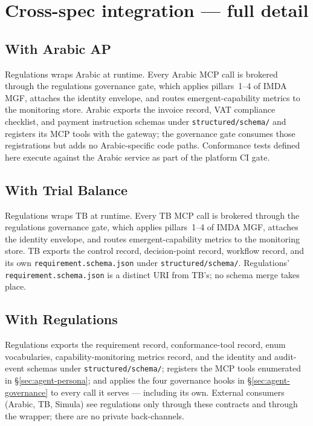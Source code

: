 \documentclass[11pt,a4paper,twoside]{report}
\begin{document}
\section{Cross-spec integration --- full detail}
\label{sec:agent-integration}

\subsection{With Arabic AP}
Regulations wraps Arabic at runtime. Every Arabic MCP call is
brokered through the regulations governance gate, which applies
pillars~1--4 of IMDA MGF, attaches the identity envelope, and routes
emergent-capability metrics to the monitoring store. Arabic exports
the invoice record, VAT compliance checklist, and payment
instruction schemas under \texttt{structured/schema/} and registers
its MCP tools with the gateway; the governance gate consumes those
registrations but adds no Arabic-specific code paths. Conformance
tests defined here execute against the Arabic service as part of
the platform CI gate.

\subsection{With Trial Balance}
Regulations wraps TB at runtime. Every TB MCP call is brokered
through the regulations governance gate, which applies pillars~1--4
of IMDA MGF, attaches the identity envelope, and routes
emergent-capability metrics to the monitoring store. TB exports the
control record, decision-point record, workflow record, and its own
\texttt{requirement.schema.json} under \texttt{structured/schema/}.
Regulations' \texttt{requirement.schema.json} is a distinct URI
from TB's; no schema merge takes place.

\subsection{With Regulations}
Regulations exports the requirement record, conformance-tool record,
enum vocabularies, capability-monitoring metrics record, and the
identity and audit-event schemas under \texttt{structured/schema/};
registers the MCP tools enumerated in \S\ref{sec:agent-persona};
and applies the four governance hooks in
\S\ref{sec:agent-governance} to every call it serves --- including
its own. External consumers (Arabic, TB, Simula) see regulations
only through these contracts and through the wrapper; there are no
private back-channels.
\end{document}
